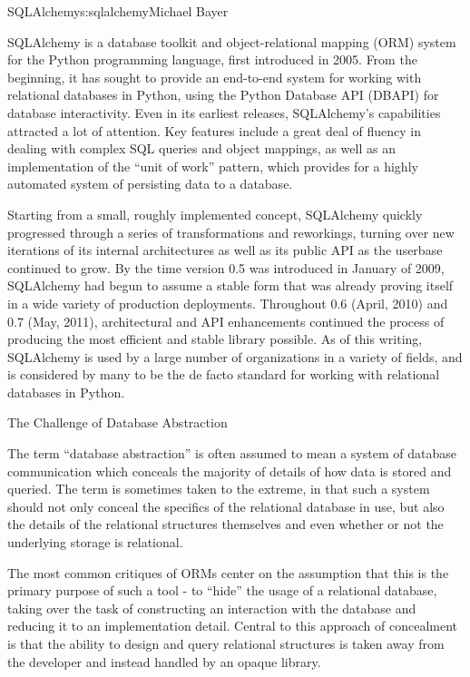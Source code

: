 \begin{aosachapter}{SQLAlchemy}{s:sqlalchemy}{Michael Bayer}

SQLAlchemy is a database toolkit and object-relational mapping (ORM) system
for the Python programming language, first introduced in 2005. From the
beginning, it has sought to provide an end-to-end system for working with
relational databases in Python, using the Python Database API (DBAPI) for
database interactivity. Even in its earliest releases, SQLAlchemy's
capabilities attracted a lot of attention. Key features include a great deal
of fluency in dealing with complex SQL queries and object mappings, as well as an
implementation of the ``unit of work'' pattern, which provides for a highly
automated system of persisting data to a database.

Starting from a small, roughly implemented concept, SQLAlchemy quickly
progressed through a series of transformations and reworkings, turning over
new iterations of its internal architectures as well as its public API as the
userbase continued to grow. By the time version 0.5 was introduced in January
of 2009, SQLAlchemy had begun to assume a stable form that was already proving
itself in a wide variety of production deployments. Throughout 0.6 (April,
2010) and 0.7 (May, 2011), architectural and API enhancements continued the
process of producing the most efficient and stable library possible. As of
this writing, SQLAlchemy is used by a large number of organizations in a
variety of fields, and is considered by many to be the de facto standard for
working with relational databases in Python.

\begin{aosasect1}{The Challenge of Database Abstraction}

The term ``database abstraction'' is often assumed to mean a system of database
communication which conceals the majority of details of how data is stored and
queried. The term is sometimes taken to the extreme, in that such a system
should not only conceal the specifics of the relational database in use, but
also the details of the relational structures themselves and even whether or
not the underlying storage is relational.

The most common critiques of ORMs center on the assumption that this is the
primary purpose of such a tool - to ``hide'' the usage of a relational database,
taking over the task of constructing an interaction with the database and
reducing it to an implementation detail.  Central to this approach of
concealment is that the ability to design and query relational structures is
taken away from the developer and instead handled by an opaque library.


\end{aosasect1}
\end{aosachapter}
